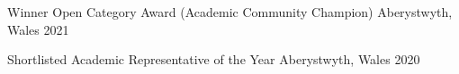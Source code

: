 



\begin{cvhonors}

  \cvhonor
    {Winner} %
    {Open Category Award (Academic Community Champion)} %
    {Aberystwyth, Wales} %
    {2021} %

  \cvhonor
    {Shortlisted} %
    {Academic Representative of the Year} %
    {Aberystwyth, Wales} %
    {2020} %

\end{cvhonors}
